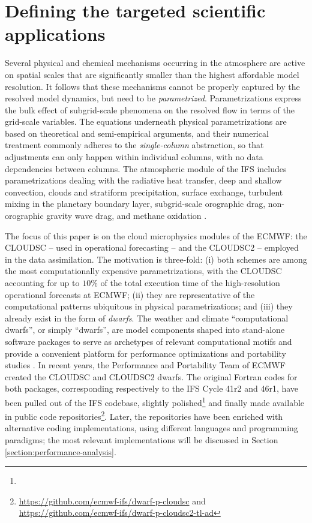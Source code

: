 \documentclass[main.tex]{subfiles}
\begin{document}
    \justifying

    \section{Defining the targeted scientific applications}
    \label{section:target-cloud-microphysics-schemes}

        Several physical and chemical mechanisms occurring in the atmosphere are active on spatial scales that are significantly smaller than the highest affordable model resolution. It follows that these mechanisms cannot be properly captured by the resolved model dynamics, but need to be \emph{parametrized}. Parametrizations express the bulk effect of subgrid-scale phenomena on the resolved flow in terms of the grid-scale variables. The equations underneath physical parametrizations are based on theoretical and semi-empirical arguments, and their numerical treatment commonly adheres to the \emph{single-column} abstraction, so that adjustments can only happen within individual columns, with no data dependencies between columns. The atmospheric module of the IFS includes parametrizations dealing with the radiative heat transfer, deep and shallow convection, clouds and stratiform precipitation, surface exchange, turbulent mixing in the planetary boundary layer, subgrid-scale orographic drag, non-orographic gravity wave drag, and methane oxidation \citep{ifs48r1}. 
        
        The focus of this paper is on the cloud microphysics modules of the ECMWF: the CLOUDSC -- used in operational forecasting -- and the CLOUDSC2 -- employed in the data assimilation. The motivation is three-fold: (i) both schemes are among the most computationally expensive parametrizations, with the CLOUDSC accounting for up to $10\%$ of the total execution time of the high-resolution operational forecasts at ECMWF; (ii) they are representative of the computational patterns ubiquitous in physical parametrizations; and (iii) they already exist in the form of \emph{dwarfs}. The weather and climate ``computational dwarfs'', or simply ``dwarfs'', are model components shaped into stand-alone software packages to serve as archetypes of relevant computational motifs \citep{muller19} and provide a convenient platform for performance optimizations and portability studies \citep{bauer20}. In recent years, the Performance and Portability Team of ECMWF created the CLOUDSC and CLOUDSC2 dwarfs. The original Fortran codes for both packages, corresponding respectively to the IFS Cycle 41r2 and 46r1, have been pulled out of the IFS codebase, slightly polished\footnote{} and finally made available in public code repositories\footnote{\url{https://github.com/ecmwf-ifs/dwarf-p-cloudsc} and \url{https://github.com/ecmwf-ifs/dwarf-p-cloudsc2-tl-ad}}. Later, the repositories have been enriched with alternative coding implementations, using different languages and programming paradigms; the most relevant implementations will be discussed in Section \ref{section:performance-analysis}.
\end{document}
